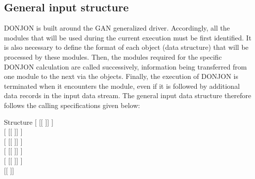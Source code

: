\subsection{General input structure}\label{sect:glob}

\vskip 0.2cm
DONJON is built around the GAN generalized driver\cite{gan1,gan2}.
Accordingly, all the modules that will be used during the current execution
must be first identified. It is also necessary to define the format of each object
(data structure) that will be processed by these modules. Then, the modules
required for the specific DONJON calculation are called successively,
information being transferred from one module to the next via the objects.
Finally, the execution of DONJON is terminated when it encounters the
 module, even if it is followed by additional data records in the
input data stream. The general input data structure therefore follows the
calling specifications given below:

\begin{DataStructure}{Structure }
$[$  $[[$  $]]$ \moc{;} $]$ \\
$[$  $[[$  $]]$ \moc{;} $]$ \\
$[$  $[[$  $]]$ \moc{;} $]$ \\
$[$  $[[$  $]]$ \moc{;} $]$ \\
$[$  $[[$  $]]$ \moc{;} $]$ \\
$[[$   \moc{;} $]]$ \\
 \moc{;}
\end{DataStructure}

